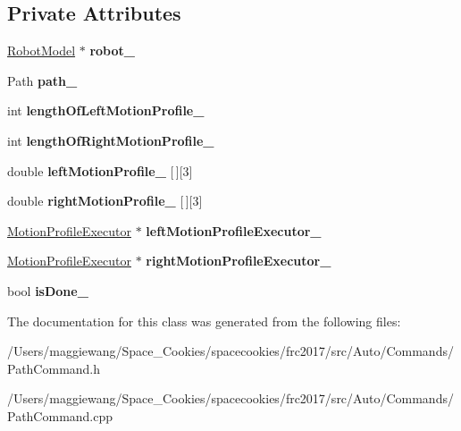 \subsection*{Private Attributes}
\begin{DoxyCompactItemize}
\item 
\mbox{\label{class_path_command_aa6a8d5bdb0c926243b0f5ccc86ad92ff}} 
\hyperlink{class_robot_model}{Robot\+Model} $\ast$ {\bfseries robot\+\_\+}
\item 
\mbox{\label{class_path_command_a8fbec2fd0e2c338fab60a437c018a7a0}} 
Path {\bfseries path\+\_\+}
\item 
\mbox{\label{class_path_command_a5e0ad49c59397dd781fe49fd010a534e}} 
int {\bfseries length\+Of\+Left\+Motion\+Profile\+\_\+}
\item 
\mbox{\label{class_path_command_a7e302dc5bdc6863670c6c808227af2ce}} 
int {\bfseries length\+Of\+Right\+Motion\+Profile\+\_\+}
\item 
\mbox{\label{class_path_command_abc8680e2a7fef01f3f524d492a2414e6}} 
double {\bfseries left\+Motion\+Profile\+\_\+} \mbox{[}$\,$\mbox{]}\mbox{[}3\mbox{]}
\item 
\mbox{\label{class_path_command_a7baa75d4c65c1a41bbb1db5cf81cae39}} 
double {\bfseries right\+Motion\+Profile\+\_\+} \mbox{[}$\,$\mbox{]}\mbox{[}3\mbox{]}
\item 
\mbox{\label{class_path_command_a7849e4b9ed084e5906894f0d9d6e2c34}} 
\hyperlink{class_motion_profile_executor}{Motion\+Profile\+Executor} $\ast$ {\bfseries left\+Motion\+Profile\+Executor\+\_\+}
\item 
\mbox{\label{class_path_command_a244b142d11c2a135ae1d0e50ed0b2979}} 
\hyperlink{class_motion_profile_executor}{Motion\+Profile\+Executor} $\ast$ {\bfseries right\+Motion\+Profile\+Executor\+\_\+}
\item 
\mbox{\label{class_path_command_a92a777a063e9beecfb3461f54306c78f}} 
bool {\bfseries is\+Done\+\_\+}
\end{DoxyCompactItemize}


The documentation for this class was generated from the following files\+:\begin{DoxyCompactItemize}
\item 
/\+Users/maggiewang/\+Space\+\_\+\+Cookies/spacecookies/frc2017/src/\+Auto/\+Commands/Path\+Command.\+h\item 
/\+Users/maggiewang/\+Space\+\_\+\+Cookies/spacecookies/frc2017/src/\+Auto/\+Commands/Path\+Command.\+cpp\end{DoxyCompactItemize}
